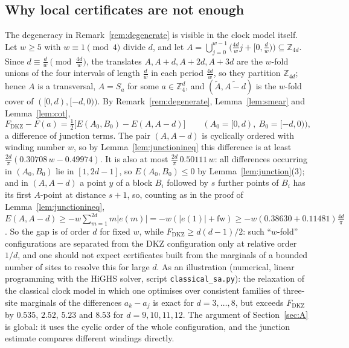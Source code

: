 \documentclass[11pt]{amsart}
\theoremstyle{definition}
\theoremstyle{remark}
\newcommand{\Z}{\mathbb{Z}}
\newcommand{\FD}{F_{\mathrm{DKZ}}}
\newcommand{\fw}{\mathrm{fw}}
\begin{document}
\subsection{Why local certificates are not enough}
The degeneracy in Remark~\ref{rem:degenerate} is visible in the clock model itself. Let $w\ge5$ with
$w\equiv1\pmod4$ divide $d$, and let $A=\bigcup_{j=0}^{w-1}\bigl(\tfrac{4d}{w}j+[0,\tfrac dw)\bigr)\subseteq\Z_{4d}$. Since
$d\equiv\frac dw\pmod{\frac{4d}w}$, the translates $A,A+d,A+2d,A+3d$ are the $w$-fold unions of the four intervals of
length $\frac dw$ in each period $\frac{4d}{w}$, so they partition $\Z_{4d}$; hence $A$ is a transversal, $A=S_a$ for some
$a\in\Z_4^d$, and $(\widetilde A,\widetilde{A-d})$ is the $w$-fold cover of $([0,d),[-d,0))$. By
Remark~\ref{rem:degenerate}, Lemma~\ref{lem:smear} and Lemma~\ref{lem:cot},
\[
\FD-F(a)=\tfrac12\bigl[E(A_0,B_0)-E(A,A-d)\bigr]\qquad(A_0=[0,d),\ B_0=[-d,0)),
\]
a difference of junction terms. The pair $(A,A-d)$ is cyclically ordered with winding number $w$, so by
Lemma~\ref{lem:junctionineq} this difference is at least $\frac{2d}\pi(0.30708\,w-0.49974)$. It is also at most
$\frac{2d}\pi\,0.50111\,w$: all differences occurring in $(A_0,B_0)$ lie in $[1,2d-1]$, so $E(A_0,B_0)\le0$ by
Lemma~\ref{lem:junction}(3); and in $(A,A-d)$ a point $y$ of a block $B_i$ followed by $s$ further points of $B_i$
has its first $A$-point at distance $s+1$, so, counting as in the proof of Lemma~\ref{lem:junctionineq},
$E(A,A-d)\ge-w\sum_{m=1}^{2d}m|e(m)|=-w(|e(1)|+\fw)\ge-w(0.38630+0.11481)\frac{4d}\pi$. So the gap is of order $d$
for fixed $w$, while $\FD\ge d(d-1)/2$: such ``$w$-fold'' configurations are separated from the DKZ
configuration only at relative order $1/d$, and one should not expect certificates built from the marginals of a
bounded number of sites to resolve this for large $d$. As an illustration (numerical, linear programming with the
HiGHS solver, script
\texttt{classical\_sa.py}): the relaxation of the classical clock model in which one optimises over consistent
families of three-site marginals of the differences $a_k-a_j$ is exact for $d=3,\dots,8$, but exceeds $\FD$ by
$0.535$, $2.52$, $5.23$ and $8.53$ for $d=9,10,11,12$. The argument of Section~\ref{sec:A} is global: it uses the
cyclic order of the whole configuration, and the junction estimate compares different windings directly.
\end{document}
